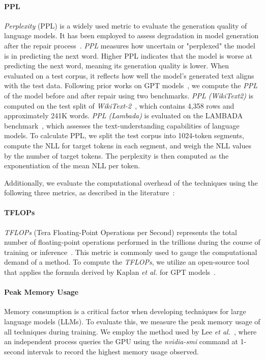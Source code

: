 \paragraph{PPL} \textit{Perplexity} (PPL) is a widely used metric to evaluate the generation quality of language models. It has been employed to assess degradation in model generation after the repair process~\cite{gehman2020realtoxicityprompts, lee2024mechanistic, geva2022transformer, wang2022exploring}. \textit{PPL} measures how uncertain or "perplexed" the model is in predicting the next word. Higher PPL indicates that the model is worse at predicting the next word, meaning its generation quality is lower. When evaluated on a test corpus, it reflects how well the model's generated text aligns with the test data. Following prior works on GPT models~\cite{geva2022transformer, lee2024mechanistic}, we compute the \textit{PPL} of the model before and after repair using two benchmarks. \textit{PPL (WikiText2)} is computed on the test split of \textit{WikiText-2}~\cite{merity2016pointer}, which contains 4,358 rows and approximately 241K words. \textit{PPL (Lambada)} is evaluated on the LAMBADA benchmark~\cite{paperno2016lambada}, which assesses the text-understanding capabilities of language models. To calculate PPL, we split the test corpus into 1024-token segments, compute the NLL for target tokens in each segment, and weigh the NLL values by the number of target tokens. The perplexity is then computed as the exponentiation of the mean NLL per token.



Additionally, we evaluate the computational overhead of the techniques using the following three metrics, as described in the literature~\cite{kaplan2020scaling,shoeybi2019megatron,lee2019energy}:

\paragraph{TFLOPs} \textit{TFLOPs} (Tera Floating-Point Operations per Second) represents the total number of floating-point operations performed in the trillions during the course of training or inference~\cite{kaplan2020scaling}. This metric is commonly used to gauge the computational demand of a method. To compute the \textit{TFLOPs}, we utilize an open-source tool~\cite{casson2023transformerflops} that applies the formula derived by Kaplan \textit{et al.} for GPT models~\cite{kaplan2020scaling}.

\paragraph{Peak Memory Usage} Memory consumption is a critical factor when developing techniques for large language models (LLMs)\cite{shoeybi2019megatron}. To evaluate this, we measure the peak memory usage of all techniques during training. We employ the method used by Lee \textit{et al.}~\cite{lee2019energy}, where an independent process queries the GPU using the \textit{nvidia-smi} command at 1-second intervals to record the highest memory usage observed.


